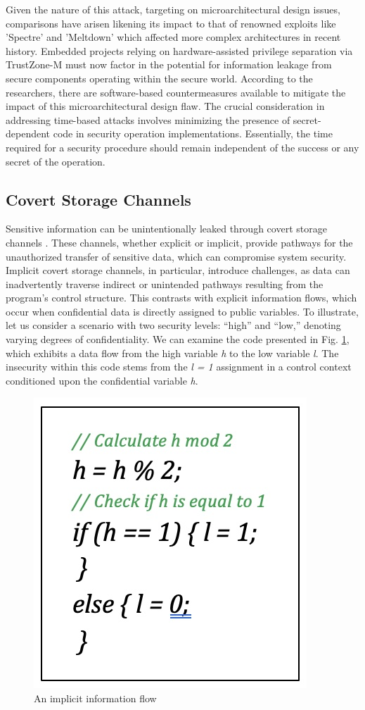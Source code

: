 Given the nature of this attack, targeting on microarchitectural design issues, comparisons have arisen likening its impact to that of renowned exploits like 'Spectre' and 'Meltdown' which affected more complex architectures in recent history. Embedded projects relying on hardware-assisted privilege separation via TrustZone-M must now factor in the potential for information leakage from secure components operating within the secure world. According to the researchers, there are software-based countermeasures available to mitigate the impact of this microarchitectural design flaw. The crucial consideration in addressing time-based attacks involves minimizing the presence of secret-dependent code in security operation implementations. Essentially, the time required for a security procedure should remain independent of the success or any secret of the operation.

\subsection{Covert Storage Channels}

Sensitive information can be unintentionally leaked through covert storage channels \cite{storagechannel, sabelfeld}. These channels, whether explicit or implicit, provide pathways for the unauthorized transfer of sensitive data, which can compromise system security. Implicit covert storage channels, in particular, introduce challenges, as data can inadvertently traverse indirect or unintended pathways resulting from the program's control structure. This contrasts with explicit information flows, which occur when confidential data is directly assigned to public variables. To illustrate, let us consider a scenario with two security levels: ``high'' and ``low,'' denoting varying degrees of confidentiality. We can examine the code presented in Fig. \ref{fig:implicit}, which exhibits a data flow from the high variable \textit{h} to the low variable \textit{l}. The insecurity within this code stems from the \textit{l = 1} assignment in a control context conditioned upon the confidential variable \textit{h}.

\begin{figure}
  \centering
  \includegraphics[width=.5\columnwidth]{figures/implicit.jpg}
  \caption[Short caption for Table of Figures]{An implicit information flow}
  \label{fig:implicit}
\end{figure}

